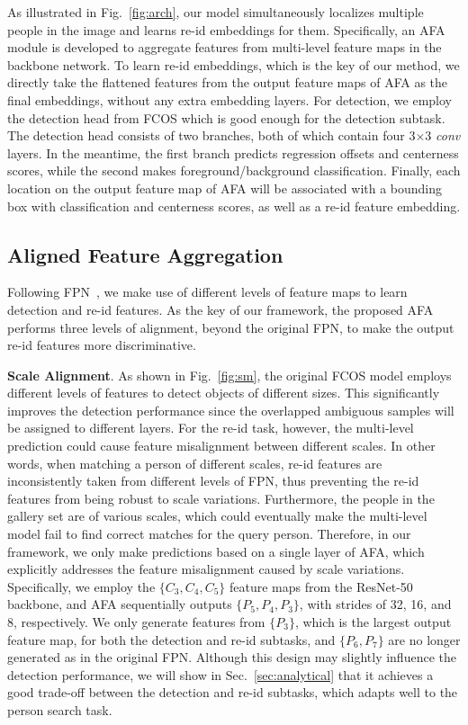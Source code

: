 \documentclass[journal]{IEEEtran}
\begin{document}
As illustrated in Fig.~\ref{fig:arch}, our model simultaneously localizes multiple people in the image and learns re-id embeddings for them. Specifically, an AFA module is developed to aggregate features from multi-level feature maps in the backbone network. To learn re-id embeddings, which is the key of our method, we directly take the flattened features from the output feature maps of AFA as the final embeddings, without any extra embedding layers. For detection, we employ the detection head from FCOS which is good enough for the detection subtask. The detection head consists of two branches, both of which contain four 3$\times$3 \emph{conv} layers. In the meantime, the first branch predicts regression offsets and centerness scores, while the second makes foreground/background classification. Finally, each location on the output feature map of AFA will be associated with a bounding box with classification and centerness scores, as well as a re-id feature embedding.

\subsection{Aligned Feature Aggregation}
Following FPN~\cite{DBLP:conf/cvpr/LinDGHHB17}, we make use of different levels of feature maps to learn detection and re-id features. As the key of our framework, the proposed AFA performs three levels of alignment, beyond the original FPN, to make the output re-id features more discriminative.


\textbf{Scale Alignment}. As shown in Fig.~\ref{fig:sm}, the original FCOS model employs different levels of features to detect objects of different sizes. This significantly improves the detection performance since the overlapped ambiguous samples will be assigned to different layers. For the re-id task, however, the multi-level prediction could cause feature misalignment between different scales.
In other words, when matching a person of different scales, re-id features are inconsistently taken from different levels of FPN, thus preventing the re-id features from being robust to scale variations.
Furthermore, the people in the gallery set are of various scales, which could eventually make the multi-level model fail to find correct matches for the query person. Therefore, in our framework, we only make predictions based on a single layer of AFA, which explicitly addresses the feature misalignment caused by scale variations. Specifically, we employ the $\{C_3, C_4, C_5\}$ feature maps from the ResNet-50 backbone, and AFA sequentially outputs $\{P_5, P_4, P_3\}$, with strides of 32, 16, and 8, respectively. We only generate features from $\{P_3\}$, which is the largest output feature map, for both the detection and re-id subtasks, and $\{P_6, P_7\}$ are no longer generated as in the original FPN. Although this design may slightly influence the detection performance, we will show in Sec.~\ref{sec:analytical} that it achieves a good trade-off between the detection and re-id subtasks, which adapts well to the person search task.
\end{document}
